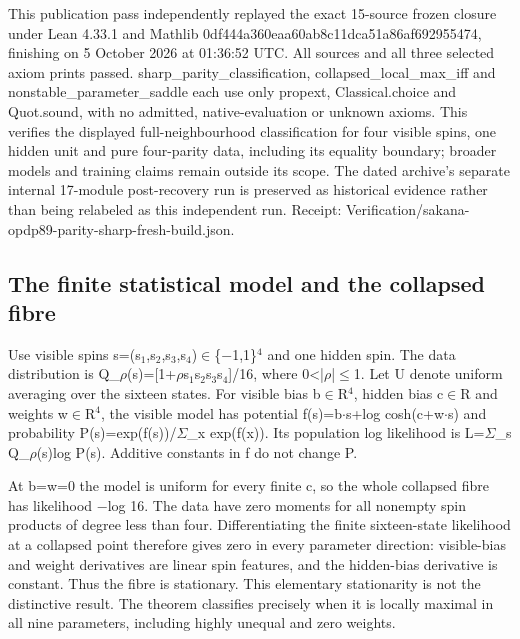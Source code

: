 \documentclass[11pt,a4paper]{article}
\begin{document}
This publication pass independently replayed the exact 15-source frozen closure under Lean 4.33.1 and Mathlib 0df444a360eaa60ab8c11dca51a86af692955474, finishing on 5 October 2026 at 01:36:52 UTC. All sources and all three selected axiom prints passed. sharp\_parity\_classification, collapsed\_local\_max\_iff and nonstable\_parameter\_saddle each use only propext, Classical.choice and Quot.sound, with no admitted, native-evaluation or unknown axioms. This verifies the displayed full-neighbourhood classification for four visible spins, one hidden unit and pure four-parity data, including its equality boundary; broader models and training claims remain outside its scope. The dated archive's separate internal 17-module post-recovery run is preserved as historical evidence rather than being relabeled as this independent run. Receipt: Verification/sakana-opdp89-parity-sharp-fresh-build.json.

\subsection{The finite statistical model and the collapsed fibre}
Use visible spins s=(s\ensuremath{_1},s\ensuremath{_2},s\ensuremath{_3},s\ensuremath{_4})\ensuremath{\in}\{\ensuremath{-}1,1\}\ensuremath{^4} and one hidden spin. The data distribution is Q\_\ensuremath{\rho}(s)=[1+\ensuremath{\rho}s\ensuremath{_1}s\ensuremath{_2}s\ensuremath{_3}s\ensuremath{_4}]/16, where 0<|\ensuremath{\rho}|\ensuremath{\leq}1. Let U denote uniform averaging over the sixteen states. For visible bias b\ensuremath{\in}R\ensuremath{^4}, hidden bias c\ensuremath{\in}R and weights w\ensuremath{\in}R\ensuremath{^4}, the visible model has potential f(s)=b\ensuremath{\cdot}s+log cosh(c+w\ensuremath{\cdot}s) and probability P(s)=exp(f(s))/\ensuremath{\Sigma}\_x exp(f(x)). Its population log likelihood is L=\ensuremath{\Sigma}\_s Q\_\ensuremath{\rho}(s)log P(s). Additive constants in f do not change P.

At b=w=0 the model is uniform for every finite c, so the whole collapsed fibre has likelihood \ensuremath{-}log 16. The data have zero moments for all nonempty spin products of degree less than four. Differentiating the finite sixteen-state likelihood at a collapsed point therefore gives zero in every parameter direction: visible-bias and weight derivatives are linear spin features, and the hidden-bias derivative is constant. Thus the fibre is stationary. This elementary stationarity is not the distinctive result. The theorem classifies precisely when it is locally maximal in all nine parameters, including highly unequal and zero weights.
\end{document}

